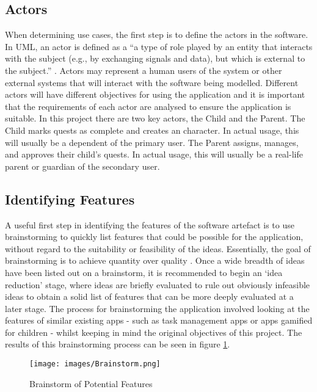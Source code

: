 \subsection{Actors}
When determining use cases, the first step is to define the actors in the software.
In UML, an actor is defined as a ``a type of role played by an entity that interacts with the subject (e.g., by exchanging signals and data), but which is external to the subject.'' \citep[p586-588]{omg2007unified}.
Actors may represent a human users of the system or other external systems that will interact with the software being modelled.
Different actors will have different objectives for using the application and it is important that the requirements of each actor are analysed to ensure the application is suitable. 
In this project there are two key actors, the Child and the Parent. 
The Child marks quests as complete and creates an character. In actual usage, this will usually be a dependent of the primary user. 
The Parent assigns, manages, and approves their child's quests. In actual usage, this will usually be a real-life parent or guardian of the secondary user.

\subsection{Identifying Features}
A useful first step in identifying the features of the software artefact is to use brainstorming to quickly list features that could be possible for the application, without regard to the suitability or feasibility of the ideas.
Essentially, the goal of brainstorming is to achieve quantity over quality \citep[p.144]{leffingwell2000managing}.
Once a wide breadth of ideas have been listed out on a brainstorm, it is recommended to begin an `idea reduction' stage, where ideas are briefly evaluated to rule out obviously infeasible ideas to obtain a solid list of features that can be more deeply evaluated at a later stage.
The process for brainstorming the application involved looking at the features of similar existing apps - such as task management apps or apps gamified for children - whilst keeping in mind the original objectives of this project.
The results of this brainstorming process can be seen in figure \ref{fig:brainstorm}.

\begin{figure}[ht]
	\centering
	\texttt{[image: images/Brainstorm.png]}
	\caption{Brainstorm of Potential Features}
	\label{fig:brainstorm}
\end{figure} 

